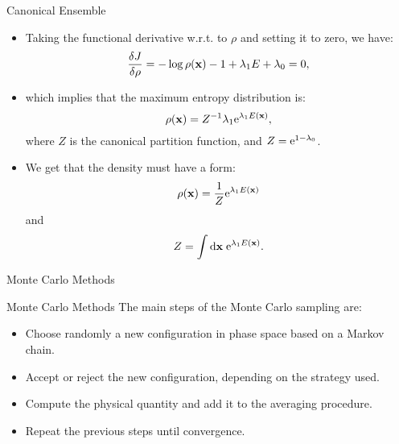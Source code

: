 \documentclass[10pt]{beamer}
\begin{document}
\begin{frame}{Canonical Ensemble}
\begin{itemize}
\setlength\itemsep{1em}
  \item Taking the functional derivative w.r.t. to $\rho$ and setting it to zero, we have:
  \begin{equation}
    \frac{\delta J}{\delta \rho} = -\log\rho({\bf x}) - 1 + \lambda_1 E + \lambda_0 = 0,
  \end{equation}

  \item which implies that the maximum entropy distribution is:
  \begin{equation}
    \rho({\bf x}) = Z^{-1} \lambda_1 \mathrm{e}^{\lambda_1 E({\bf x})},
  \end{equation}
  where $Z$ is the canonical partition function, and $Z=\mathrm{e}^{1-\lambda_0}$.

  \item We get that the density must have a form:
  \begin{equation}
    \rho({\bf x}) = \frac{1}{Z}\mathrm{e}^{\lambda_1 E({\bf x})}
  \end{equation}
  and
  \begin{equation}
    Z = \int\mathrm{d}{\bf x}\; \mathrm{e}^{\lambda_1 E({\bf x})}.
  \end{equation}
\end{itemize}
\end{frame}

\begin{frame}{}
  \begin{center}
    \fontsize{25pt}{6}\selectfont\vspace{1.2cm}
    \textcolor{subtitle}{Monte Carlo Methods}
  \end{center}
\end{frame}

\begin{frame}{Monte Carlo Methods}
The main steps of the Monte Carlo sampling are:
\vspace*{0.5cm}
\begin{itemize}
\setlength\itemsep{1em}
  \item Choose randomly a new configuration in phase space based on a Markov chain.
  \item Accept or reject the new configuration, depending on the strategy used.
  \item Compute the physical quantity and add it to the averaging procedure.
  \item Repeat the previous steps until convergence.
\end{itemize}
\end{frame}
\end{document}
